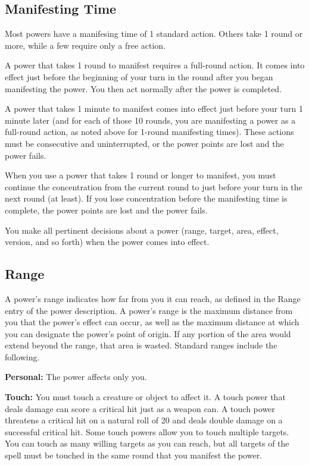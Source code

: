 

\subsection{Manifesting Time}
Most powers have a manifesing time of 1 standard action. Others take 1 round or more, while a few require only a free action.

A power that takes 1 round to manifest requires a full-round action. It comes into effect just before the beginning of your turn in the round after you began manifesting the power. You then act normally after the power is completed.

A power that takes 1 minute to manifest comes into effect just before your turn 1 minute later (and for each of those 10 rounds, you are manifesting a power as a full-round action, as noted above for 1-round manifesting times). These actions must be consecutive and uninterrupted, or the power points are lost and the power fails.

When you use a power that takes 1 round or longer to manifest, you must continue the concentration from the current round to just before your turn in the next round (at least). If you lose concentration before the manifesting time is complete, the power points are lost and the power fails.

You make all pertinent decisions about a power (range, target, area, effect, version, and so forth) when the power comes into effect.

\subsection{Range}
A power's range indicates how far from you it can reach, as defined in the Range entry of the power description. A power's range is the maximum distance from you that the power's effect can occur, as well as the maximum distance at which you can designate the power's point of origin. If any portion of the area would extend beyond the range, that area is wasted. Standard ranges include the following.

\textbf{Personal:} The power affects only you.

\textbf{Touch:} You must touch a creature or object to affect it. A touch power that deals damage can score a critical hit just as a weapon can. A touch power threatens a critical hit on a natural roll of 20 and deals double damage on a successful critical hit. Some touch powers allow you to touch multiple targets. You can touch as many willing targets as you can reach, but all targets of the spell must be touched in the same round that you manifest the power.

